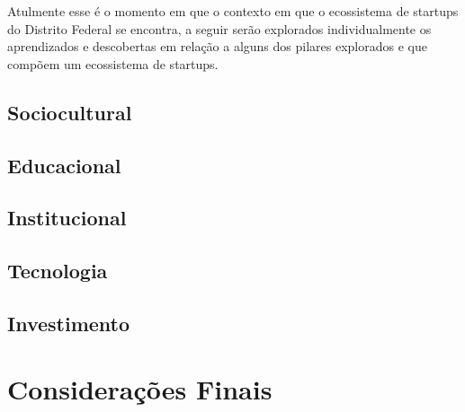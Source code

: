 Atulmente esse é o momento em que o contexto em que o ecossistema de startups do Distrito Federal se encontra, a seguir serão explorados individualmente os aprendizados e descobertas em relação a alguns dos pilares explorados e que compõem um ecossistema de startups.   

\subsection{Sociocultural}
\label{subsection:pergunta_de_pesquisa_2}





\subsection{Educacional}
\label{subsection:Educação}

\subsection{Institucional}
\label{subsection:Institucional}

\subsection{Tecnologia}
\label{subsection:Tecnologia}

\subsection{Investimento}
\label{subsection:Investimento}



\section{Considerações Finais}
\label{subsection:consideracoes_finais}